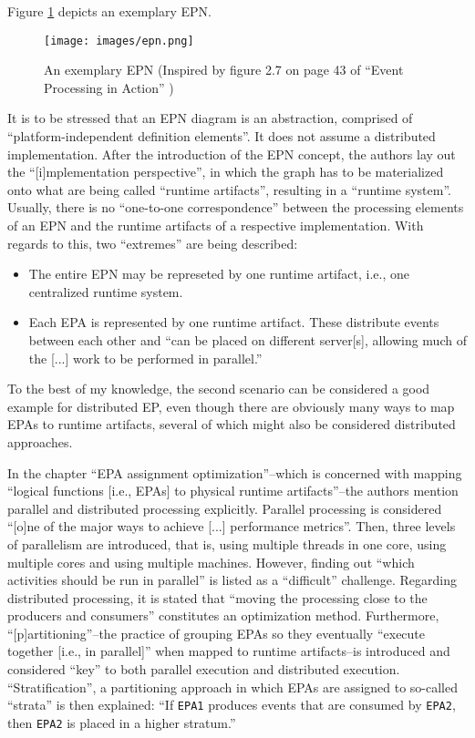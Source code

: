 \documentclass[article, type=bsc, colorback, accentcolor=tud8b, parskip=half, bibliography=totocnumbered]{tudthesis}
\begin{document}
Figure \ref{fig:epn} depicts an exemplary EPN.

\begin{figure}
\caption{An exemplary EPN (Inspired by figure 2.7 on page 43 of ``Event Processing in Action'' \cite{Etzion:2010:EPA:1894960})}
\label{fig:epn}
\texttt{[image: images/epn.png]}
\centering
\end{figure}

It is to be stressed that an EPN diagram is an abstraction, comprised of ``platform-independent definition elements''.
It does not assume a distributed implementation.
After the introduction of the EPN concept, the authors lay out the ``[i]mplementation perspective'', in which the graph has to be materialized onto what are being called ``runtime artifacts'', resulting in a ``runtime system''.
Usually, there is no ``one-to-one correspondence'' between the processing elements of an EPN and the runtime artifacts of a respective implementation.
With regards to this, two ``extremes'' are being described:

\begin{itemize}
\item
The entire EPN may be represeted by one runtime artifact, i.e., one centralized runtime system.
\item
Each EPA is represented by one runtime artifact.
These distribute events between each other and ``can be placed on different server[s], allowing much of the [...] work to be performed in parallel.''
\end{itemize}

To the best of my knowledge, the second scenario can be considered a good example for distributed EP, even though there are obviously many ways to map EPAs to runtime artifacts, several of which might also be considered distributed approaches.

In the chapter ``EPA assignment optimization''--which is concerned with mapping ``logical functions [i.e., EPAs] to physical runtime artifacts''--the authors mention parallel and distributed processing explicitly.
Parallel processing is considered ``[o]ne of the major ways to achieve [...] performance metrics''.
Then, three levels of parallelism are introduced, that is, using multiple threads in one core, using multiple cores and using multiple machines.
However, finding out ``which activities should be run in parallel'' is listed as a ``difficult'' challenge.
Regarding distributed processing, it is stated that ``moving the processing close to the producers and consumers'' constitutes an optimization method.
Furthermore, ``[p]artitioning''--the practice of grouping EPAs so they eventually ``execute together [i.e., in parallel]'' when mapped to runtime artifacts--is introduced and considered ``key'' to both parallel execution and distributed execution.
``Stratification'', a partitioning approach in which EPAs are assigned to so-called ``strata'' is then explained: ``If \lstinline{EPA1} produces events that are consumed by \lstinline{EPA2}, then \lstinline{EPA2} is placed in a higher stratum.''
\end{document}
